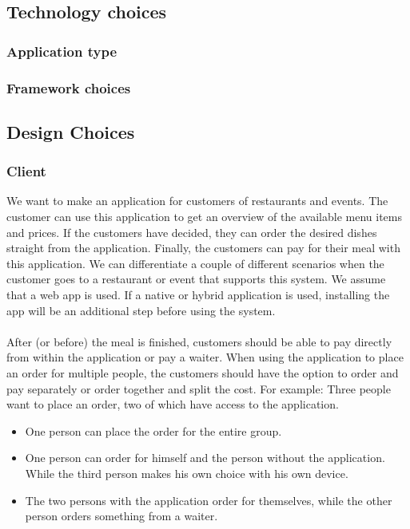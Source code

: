 \documentclass[12pt]{article}
\begin{document}
\begin{multicols}{2}
\subsection{Technology choices}
\subsubsection{Application type}
\subsubsection{Framework choices}
\subsection{Design Choices}
\subsubsection{Client}
We want to make an application for customers of restaurants and events. The customer can use this application to get an overview of the available menu items and prices. If the customers have decided, they can order the desired dishes straight from the application. Finally, the customers can pay for their meal with this application.
We can differentiate a couple of different scenarios when the customer goes to a restaurant or event that supports this system. We assume that a web app is used. If a native or hybrid application is used, installing the app will be an additional step before using the system.
\\\\
After (or before) the meal is finished, customers should be able to pay directly from within the application or pay a waiter. When using the application to place an order for multiple people, the customers should have the option to order and pay separately or order together and split the cost. 
For example: Three people want to place an order, two of which have access to the application. 
\begin{itemize}
	\raggedright
	\item One person can place the order for the entire group.
	\item One person can order for himself and the person without the application. While the third person makes his own choice with his own device.
	\item The two persons with the application order for themselves, while the other person orders something from a waiter.
\end{itemize}


\end{multicols}
\end{document}
